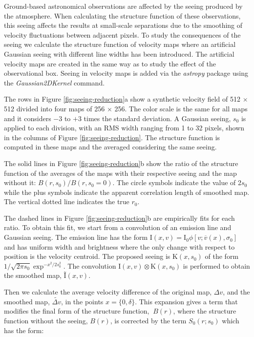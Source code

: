 \documentclass[fleqn,usenatbib, useAMS, a4paper]{mnras}
\begin{document}
Ground-based astronomical observations are affected by the seeing produced by the atmosphere.
When calculating the structure function of these observations, this seeing affects the results at small-scale separations due to the smoothing of velocity fluctuations between adjacent pixels.
To study the consequences of the seeing we calculate the structure function of velocity maps where an artificial Gaussian seeing with different line widths has been introduced.
The artificial velocity maps are created in the same way as to study the effect of the observational box.
Seeing in velocity maps is added via the \textit{astropy} package using the \textit{Gaussian2DKernel} command. 

The rows in Figure \ref{fig:seeing-reduction}a show a synthetic velocity field of 512 \(\times\) 512 divided into four maps of 256 \(\times \) 256.
The color scale is the same for all maps and it considers \(- 3\) to \(+ 3\) times the standard deviation.
A Gaussian seeing, \(s_0 \) is applied to each division, with an RMS width ranging from 1 to 32 pixels, shown in the columns of Figure \ref{fig:seeing-reduction}. 
The structure function is computed in these maps and the averaged considering the same seeing. 

The solid lines in Figure \ref{fig:seeing-reduction}b  show the ratio of the structure function of the averages of the maps with their respective seeing and the map without it: \(B (r, s_0 ) / B (r, s_0 = 0) \).
The circle symbols indicate the value of 2\(s_0\) while the plus symbols indicate the apparent correlation length of smoothed map.
The vertical dotted line indicates the true \(r_ {0} \). 

The dashed lines in Figure \ref{fig:seeing-reduction}b are  empirically fits for each ratio.
To obtain this fit, we start from a convolution of an emission line and Gaussian seeing.
The emission line has the form \(\text {I}(x, v) = \text{I}_0 \phi [v; \overline {v} (x), \sigma_0]\) and has uniform width and brightness where the only change with respect to position is the velocity centroid.
The proposed seeing is \(\text{K}(x, s_0)\) of the form \(1 / \sqrt{2 \pi s_0} \exp^ {-x^ 2 / 2s_0 ^ 2} \).
The convolution \(\text{I}(x, v) \otimes \text{K}(x, s_0) \) is performed to obtain the smoothed map, \(\text {\~I} (x, v) \). 

Then we calculate the average velocity difference of the original map, \(\Delta v \), and the smoothed map, \(\tilde{\Delta v}\), in the points \( x = \{0, \delta \} \).
This expansion gives a term that modifies the final form of the structure function, \(~B (r)\), where the structure function without the seeing, \(B(r) \), is corrected by the term \(S_0(r; s_0)\) which has the form: 
\end{document}
